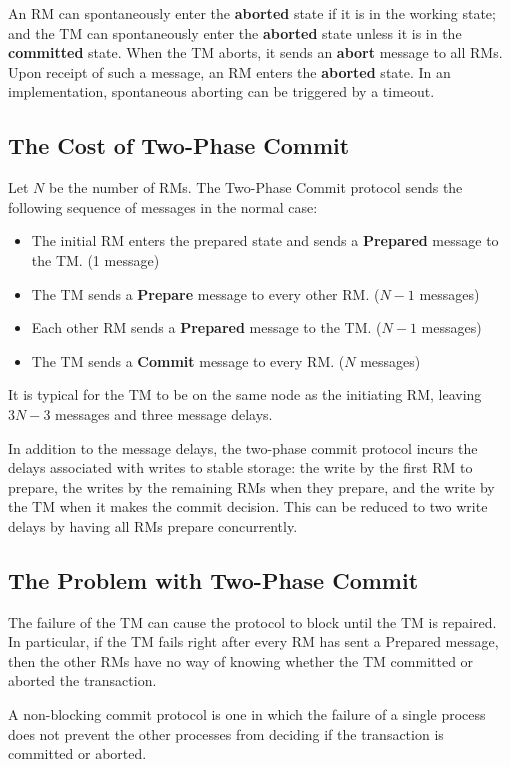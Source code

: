 \documentclass[11pt]{article}
\begin{document}
An RM can spontaneously enter the \textbf{aborted} state if it is in the working state; and the TM can
spontaneously enter the \textbf{aborted} state unless it is in the \textbf{committed} state. When the TM aborts, it
sends an \textbf{abort} message to all RMs. Upon receipt of such a message, an RM enters the \textbf{aborted} state. In
an implementation, spontaneous aborting can be triggered by a timeout.
\subsection{The Cost of Two-Phase Commit}
\label{sec:orge95b460}
Let \(N\) be the number of RMs. The Two-Phase Commit protocol sends the following sequence of messages
in the normal case:
\begin{itemize}
\item The initial RM enters the prepared state and sends a \textbf{Prepared} message to the TM. (1 message)
\item The TM sends a \textbf{Prepare} message to every other RM. (\(N-1\) messages)
\item Each other RM sends a \textbf{Prepared} message to the TM. (\(N-1\) messages)
\item The TM sends a \textbf{Commit} message to every RM. (\(N\) messages)
\end{itemize}

It is typical for the TM to be on the same node as the initiating RM, leaving \(3N-3\) messages and
three message delays.

In addition to the message delays, the two-phase commit protocol incurs the delays associated with
writes to stable storage: the write by the first RM to prepare, the writes by the remaining RMs when
they prepare, and the write by the TM when it makes the commit decision. This can be reduced to two
write delays by having all RMs prepare concurrently.
\subsection{The Problem with Two-Phase Commit}
\label{sec:org69e1823}
The failure of the TM can cause the protocol to block until the TM is repaired. In particular, if the
TM fails right after every RM has sent a Prepared message, then the other RMs have no way of knowing
whether the TM committed or aborted the transaction.

A non-blocking commit protocol is one in which the failure of a single process does not prevent the
other processes from deciding if the transaction is committed or aborted.
\end{document}
